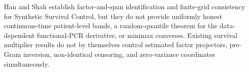 Han and Shah establish factor-and-span identification and finite-grid consistency for Synthetic Survival Control, but they do not provide uniformly honest continuous-time patient-level bands, a random-quantile theorem for the data-dependent functional-PCR derivative, or minimax converses. Existing survival multiplier results do not by themselves control estimated factor projectors, pre-Gram inversion, non-identical censoring, and zero-variance coordinates simultaneously.